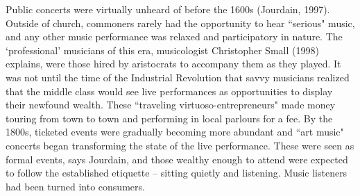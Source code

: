 Public concerts were virtually unheard of before the 1600s (Jourdain, 1997). Outside of church, commoners rarely had the opportunity to hear ``serious" music, and any other music performance was relaxed and participatory in nature. The `professional' musicians of this era, musicologist Christopher Small (1998) explains, were those hired by aristocrats to accompany them as they played. It was not until the time of the Industrial Revolution that savvy musicians realized that the middle class would see live performances as opportunities to display their newfound wealth. These ``traveling virtuoso-entrepreneurs" made money touring from town to town and performing in local parlours for a fee. By the 1800s, ticketed events were gradually becoming more abundant and ``art music" concerts began transforming the state of the live performance. These were seen as formal events, says Jourdain, and those wealthy enough to attend were expected to follow the established etiquette -- sitting quietly and listening. Music listeners had been turned into consumers.

